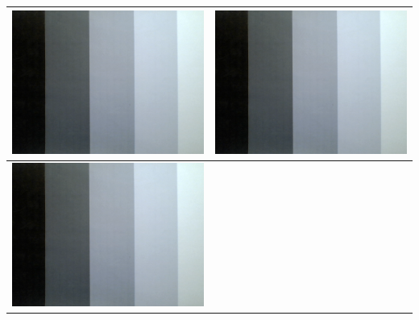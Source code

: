 \begin{tabular}{|c|c|}
 \\ 
\hline 
\includegraphics[scale=0.25]{media/grauwertkeil.png}
 & 
\includegraphics[scale=0.25]{media/grauwertkeil.png}
 \\ 
\hline 
\includegraphics[scale=0.25]{media/grauwertkeil.png}

\end{tabular}
